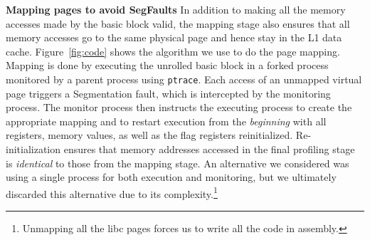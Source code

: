 \textbf{Mapping pages to avoid SegFaults}
In addition to making all the memory accesses made by the basic block valid,
the mapping stage also ensures that all memory accesses go to the same physical page and hence stay in the L1 data cache. 
Figure~\ref{fig:code} shows the algorithm we use to do the page mapping.
Mapping is done by executing the unrolled basic block in a forked process
 monitored by a parent process using \verb|ptrace|.
Each access of an unmapped virtual page triggers a Segmentation fault, which is intercepted by
the monitoring process. The monitor process then instructs the 
executing process to create the appropriate mapping
and to restart execution from the \textit{beginning}
with all registers, memory values,
as well as the flag registers reinitialized.
Re-initialization ensures that memory addresses accessed in the final profiling
stage is \textit{identical} to those from the mapping stage.
An alternative we considered was using a single process for both execution
and monitoring, but we ultimately discarded this alternative due to
its complexity.\footnote{Unmapping all the libc pages forces us to write all the code in assembly.}



%    
%    
%    
%    
%    

